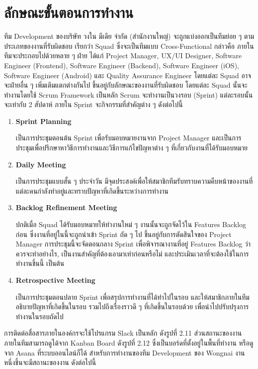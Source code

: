 \section{ลักษณะขั้นตอนการทำงาน}
ทีม Development ของบริษัท วงใน มีเดีย จำกัด (สำนักงานใหญ่) จะถูกแบ่งออกเป็นทีมย่อย ๆ ตามประเภทของงานที่รับผิดชอบ เรียกว่า Squad ซึ่งจะเป็นทีมแบบ Cross-Functional กล่าวคือ ภายในทีมจะประกอบไปด้วยหลาย ๆ ฝ่าย ได้แก่ Project Manager, UX/UI Designer, Software Engineer (Frontend), Software Engineer (Backend), Software Engineer (iOS), Software Engineer (Android) และ Quality Assurance Engineer โดยแต่ละ Squad อาจจะฝ่ายอื่น ๆ เพิ่มเติมแตกต่างกันไป ขึ้นอยู่กับลักษณะของงานที่รับผิดชอบ โดยแต่ละ Squad นั้นจะทำงานโดยใช้ Scrum Framework เป็นหลัก Scrum จะทำงานเป็นวงรอบ (Sprint) แต่ละรอบนั้นจะเท่ากับ 2 สัปดาห์ ภายใน Sprint จะกิจกรรมที่สำคัญต่าง ๆ ดังต่อไปนี้
\begin{enumerate}
	\item \textbf{Sprint Planning}
	
	เป็นการประชุมตอนต้น Sprint เพื่อรับมอบหมายงานจาก Project Manager และเป็นการประชุมเพื่อปรึกษาหาวิธีการทำงานและวิธีการแก้ไขปัญหาต่าง ๆ ที่เกี่ยวกับงานที่ได้รับมอบหมาย
	
	\item \textbf{Daily Meeting}
	
	เป็นการประชุมแบบสั้น ๆ ประจำวัน มีจุดประสงค์เพื่อให้สมาชิกทีมรับทราบความคืบหน้าของงานที่แต่ละคนกำลังทำอยู่และทราบปัญหาที่เกิดขึ้นระหว่างการทำงาน
	
	\item \textbf{Backlog Refinement Meeting}
	
	ปกติเมื่อ Squad ได้รับมอบหมายให้ทำงานใหม่ ๆ งานนั้นจะถูกจัดไว้ใน Features Backlog ก่อน ซึ่งงานที่อยู่ในนี้จะถูกนำเข้า Sprint ถัด ๆ ไป ขึ้นอยู่กับการตัดสินใจของ Project Manager การประชุมนี้จะจัดตอนกลาง Sprint เพื่อพิจารณางานที่อยู่ Features Backlog ว่าควรจะทำอย่างไร, เป็นงานสำคัญที่ต้องเอามาเท่าก่อนหรือไม่ และประเมินเวลาที่จะต้องใช้ในการทำงานชิ้นนี้ เป็นต้น
	
	\item \textbf{Retrospective Meeting}
	
	เป็นการประชุมตอนปลาย Sprint เพื่อสรุปการทำงานที่ได้ทำไปในรอบ และให้สมาชิกภายในทีมอธิบายปัญหาที่เกิดขึ้นในรอบ รวมไปถึงเรื่องราวดี ๆ ที่เกิดขึ้นในรอบด้วย เพื่อนำไปปรับปรุงการทำงานในรอบถัดไป
\end{enumerate}

การติดต่อสื่อสารภายในองค์กรจะใช้โปรแกรม Slack เป็นหลัก ดังรูปที่ 2.11 ส่วนสถานะของงานภายในทีมสามารถดูได้จาก Kanban Board ดังรูปที่ 2.12 ซึ่งเป็นบอร์ดที่ตั้งอยู่ในพื้นที่ทำงาน หรือดูจาก Asana ที่ระบบออนไลน์ก็ได้ สำหรับการทำงานของทีม Development ของ Wongnai งานหนึ่งชิ้นจะมีสถานะของงาน ดังต่อไปนี้

